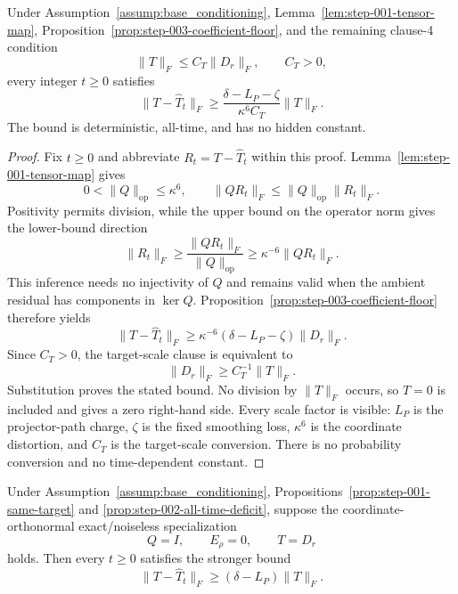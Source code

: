 \begin{proposition}
\label{prop:step-003-ambient-floor}
Under Assumption~\ref{assump:base_conditioning},
Lemma~\ref{lem:step-001-tensor-map},
Proposition~\ref{prop:step-003-coefficient-floor}, and the remaining
clause-4 condition
\[
\|T\|_F\leq C_T\|D_r\|_F,
\qquad C_T>0,
\]
every integer $t\geq0$ satisfies
\[
\|T-\widehat T_t\|_F
\geq
\frac{\delta-L_P-\zeta}{\kappa^6C_T}\|T\|_F.
\]
The bound is deterministic, all-time, and has no hidden constant.
\end{proposition}

\begin{proof}
Fix $t\geq0$ and abbreviate $R_t=T-\widehat T_t$ within this proof.
Lemma~\ref{lem:step-001-tensor-map} gives
\[
0<\|Q\|_{\mathrm{op}}\leq\kappa^6,
\qquad
\|QR_t\|_F\leq\|Q\|_{\mathrm{op}}\|R_t\|_F.
\]
Positivity permits division, while the upper bound on the operator norm gives
the lower-bound direction
\[
\|R_t\|_F
\geq\frac{\|QR_t\|_F}{\|Q\|_{\mathrm{op}}}
\geq\kappa^{-6}\|QR_t\|_F.
\]
This inference needs no injectivity of $Q$ and remains valid when the ambient
residual has components in $\ker Q$.  Proposition~\ref{prop:step-003-coefficient-floor}
therefore yields
\[
\|T-\widehat T_t\|_F
\geq\kappa^{-6}(\delta-L_P-\zeta)\|D_r\|_F.
\]
Since $C_T>0$, the target-scale clause is equivalent to
\[
\|D_r\|_F\geq C_T^{-1}\|T\|_F.
\]
Substitution proves the stated bound.  No division by $\|T\|_F$ occurs, so
$T=0$ is included and gives a zero right-hand side.  Every scale factor is
visible: $L_P$ is the projector-path charge, $\zeta$ is the fixed smoothing
loss, $\kappa^6$ is the coordinate distortion, and $C_T$ is the target-scale
conversion.  There is no probability conversion and no time-dependent
constant.
\end{proof}

\begin{proposition}
\label{prop:step-003-baseline-floor}
Under Assumption~\ref{assump:base_conditioning},
Propositions~\ref{prop:step-001-same-target} and
\ref{prop:step-002-all-time-deficit}, suppose the coordinate-orthonormal
exact/noiseless specialization
\[
Q=I,
\qquad E_\rho=0,
\qquad T=D_r
\]
holds.  Then every $t\geq0$ satisfies the stronger bound
\[
\|T-\widehat T_t\|_F\geq(\delta-L_P)\|T\|_F.
\]
\end{proposition}

